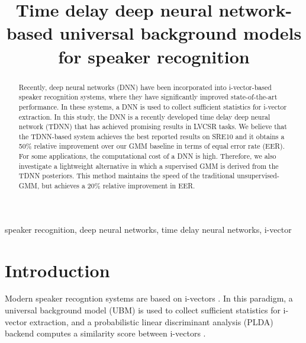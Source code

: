 \documentclass{article}
\title{Time delay deep neural network-based universal background models for speaker recognition\vspace{-2ex}}
\begin{document}
%
\maketitle
%
\begin{abstract}

Recently, deep neural networks (DNN) have been incorporated into i-vector-based speaker
recognition systems, where they have significantly improved state-of-the-art performance. In these
systems, a DNN is used to collect sufficient statistics for i-vector extraction.
In this study, the DNN is a recently developed time delay deep neural network
(TDNN) that has achieved promising results in LVCSR tasks. 
We believe that the
TDNN-based system achieves the best reported results on SRE10 and it obtains a 50\% relative 
improvement over our GMM baseline in terms of equal error rate (EER). 
For some applications, the computational cost of a DNN is high. 
Therefore, we also investigate a lightweight alternative in which a supervised GMM is derived from
the TDNN posteriors. This method maintains the speed of the traditional unsupervised-GMM,
but achieves a 20\% relative improvement in EER.
\end{abstract}
%
\begin{keywords}
speaker recognition, deep neural networks, time delay neural networks, i-vector
\end{keywords}
%
\vspace{12mm}
\section{Introduction}
\label{sec:intro}

Modern speaker recogntion systems are based on i-vectors \cite{ivector}.
In this paradigm, a universal background model (UBM) is used to collect
sufficient statistics for i-vector extraction, and a probabilistic 
linear discriminant analysis (PLDA) backend computes a similarity score between i-vectors
 \cite{plda_prince, brummer2010speaker, kenny2010bayesian, villalba2011towards, garcia2011analysis, garcia2012multicondition}.
\end{document}
